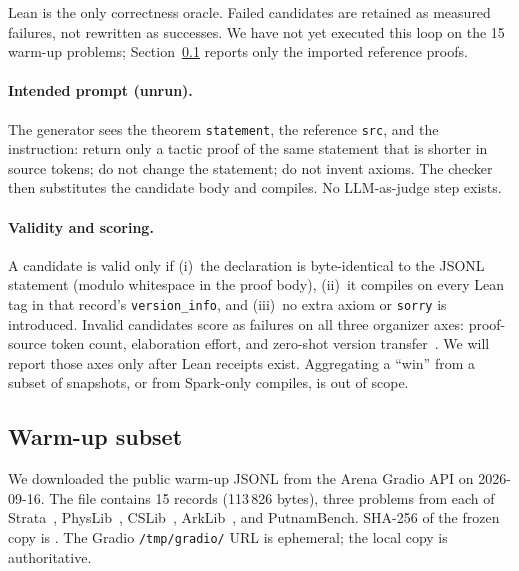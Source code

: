 \documentclass{article}
\begin{document}
Lean is the only correctness oracle. Failed candidates are retained as measured failures, not rewritten as successes. We have not yet executed this loop on the 15 warm-up problems; Section~\ref{warmup} reports only the imported reference proofs.

\paragraph{Intended prompt (unrun).} The generator sees the theorem \texttt{statement}, the reference \texttt{src}, and the instruction: return only a tactic proof of the same statement that is shorter in source tokens; do not change the statement; do not invent axioms. The checker then substitutes the candidate body and compiles. No LLM-as-judge step exists.

\paragraph{Validity and scoring.} A candidate is valid only if (i)~the declaration is byte-identical to the JSONL statement (modulo whitespace in the proof body), (ii)~it compiles on every Lean tag in that record's \texttt{version\_info}, and (iii)~no extra axiom or \texttt{sorry} is introduced. Invalid candidates score as failures on all three organizer axes: proof-source token count, elaboration effort, and zero-shot version transfer~\cite{vericodegen2026}. We will report those axes only after Lean receipts exist. Aggregating a ``win'' from a subset of snapshots, or from Spark-only compiles, is out of scope.

\subsection{Warm-up subset}
\label{warmup}

We downloaded the public warm-up JSONL from the Arena Gradio API on 2026-09-16. The file contains 15 records (113\,826 bytes), three problems from each of Strata~\cite{strata}, PhysLib~\cite{physlib}, CSLib~\cite{cslib}, ArkLib~\cite{arklib}, and PutnamBench. SHA-256 of the frozen copy is . The Gradio \texttt{/tmp/gradio/} URL is ephemeral; the local copy is authoritative.

\begin{table}[ht]
  \caption{Public warm-up subset (15 problems). Proof tokens are the JSONL \texttt{proof\_length} field. Short names are last-component labels; full identifiers are in the appendix. No refactoring scores are reported.}
  \label{warmup-table}
  \centering
  \small
  
\end{table}
\end{document}
